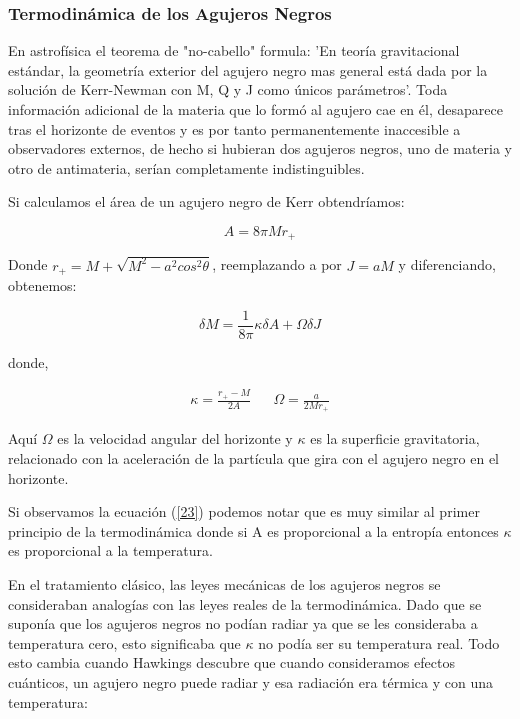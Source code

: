 \documentclass{article}
\begin{document}
\subsubsection{Termodinámica de los Agujeros Negros}
En astrofísica el teorema de "no-cabello" formula: 'En teoría gravitacional estándar, la geometría exterior del agujero negro mas general está dada por la solución de Kerr-Newman con M, Q y J como únicos parámetros'.\cite{garcia2007termodinamica}
Toda información adicional de la materia que lo formó al agujero cae en él, desaparece tras el horizonte de eventos y es por tanto permanentemente inaccesible a observadores externos, de hecho si hubieran dos agujeros negros, uno de materia y otro de antimateria, serían completamente indistinguibles.\cite{garcia2007termodinamica}

Si calculamos el área de un agujero negro de Kerr obtendríamos:\cite{teukolsky2015kerr}

\begin{equation}\label{AreaKerr}
    A=8\pi Mr_{+}
\end{equation}

Donde $r_{+}=M+\sqrt{M^{2}-a^{2}cos^{2}\theta}$, reemplazando a por $J=aM$ y diferenciando, obtenemos:\cite{teukolsky2015kerr}

\begin{equation}\label{23}
    \delta M=\frac{1}{8\pi}\kappa \delta A+ \Omega \delta J
\end{equation}

donde,

\begin{align}
    \kappa=\frac{r_{+}-M}{2A}&&\Omega=\frac{a}{2Mr_{+}}
\end{align}

Aquí $\Omega$ es la velocidad angular del horizonte y $\kappa$ es la superficie gravitatoria, relacionado con la aceleración de la partícula que gira con el agujero negro en el horizonte.\cite{teukolsky2015kerr}

Si observamos la ecuación (\ref{23}) podemos notar que es muy similar al primer principio de la termodinámica donde si A es proporcional a la entropía entonces $\kappa$ es proporcional a la temperatura.\cite{teukolsky2015kerr}

En el tratamiento clásico, las leyes mecánicas de los agujeros negros se consideraban analogías con las leyes reales de la termodinámica. Dado que se suponía que los agujeros negros no podían radiar ya que se les consideraba a temperatura cero, esto significaba que $\kappa$ no podía ser su temperatura real. Todo esto cambia cuando Hawkings descubre que cuando consideramos efectos cuánticos, un agujero negro puede radiar y esa radiación era térmica y con una temperatura:\cite{teukolsky2015kerr}
\end{document}
